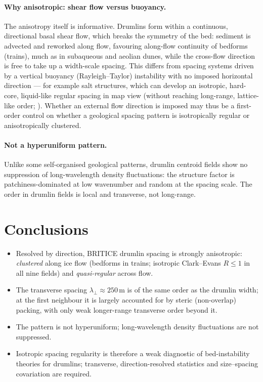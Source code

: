\documentclass[11pt]{article}
\begin{document}
\paragraph{Why anisotropic: shear flow versus buoyancy.}
The anisotropy itself is informative. Drumlins form within a continuous, directional basal shear flow,
which breaks the symmetry of the bed: sediment is advected and reworked along flow, favouring along-flow
continuity of bedforms (trains), much as in subaqueous and aeolian dunes, while the cross-flow direction
is free to take up a width-scale spacing. This differs from spacing systems driven by a vertical
buoyancy (Rayleigh--Taylor) instability with no imposed horizontal direction --- for example salt
structures, which can develop an isotropic, hard-core, liquid-like regular spacing in map view (without
reaching long-range, lattice-like order; \citealp{chen2026salt}). Whether an external flow direction is
imposed may thus be a first-order control on whether a geological spacing pattern is isotropically
regular or anisotropically clustered.

\paragraph{Not a hyperuniform pattern.}
Unlike some self-organised geological patterns, drumlin centroid fields show no suppression of
long-wavelength density fluctuations: the structure factor is patchiness-dominated at low wavenumber and
random at the spacing scale. The order in drumlin fields is local and transverse, not long-range.

\section{Conclusions}
\begin{itemize}\setlength\itemsep{1pt}
\item Resolved by direction, BRITICE drumlin spacing is strongly anisotropic: \emph{clustered} along ice
flow (bedforms in trains; isotropic Clark--Evans $R\le1$ in all nine fields) and \emph{quasi-regular}
across flow.
\item The transverse spacing $\lambda_\perp\!\approx\!250$\,m is of the same order as the drumlin width;
at the first neighbour it is largely accounted for by steric (non-overlap) packing, with only weak
longer-range transverse order beyond it.
\item The pattern is not hyperuniform; long-wavelength density fluctuations are not suppressed.
\item Isotropic spacing regularity is therefore a weak diagnostic of bed-instability theories for
drumlins; transverse, direction-resolved statistics and size--spacing covariation are required.
\end{itemize}
\end{document}
